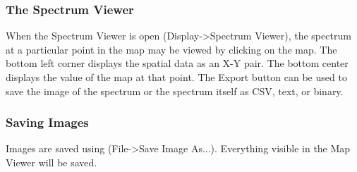 \documentclass[12pt]{achemso} %
\begin{document}
\subsubsection{The Spectrum Viewer} When the Spectrum Viewer is open
(Display->Spectrum Viewer), the spectrum at a particular point in the map may be
viewed by clicking on the map. The bottom left corner displays the spatial data
as an X-Y pair. The bottom center displays the value of the map at that point.
The Export button can be used to save the image of the spectrum or the spectrum
itself as CSV, text, or binary. \subsubsection{Saving Images} Images are saved
using (File->Save Image As...). Everything visible in the Map Viewer will be
saved.




 
\end{document}
